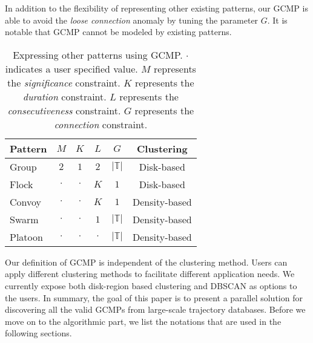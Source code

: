 In addition to the flexibility of representing other existing patterns, our GCMP is able to avoid the \emph{loose connection} anomaly by tuning the parameter $G$. 
It is notable that GCMP cannot be modeled by existing patterns. 
\begin{table}[h]
\centering
\begin{tabular}{|l|c|c|c|c|c|}
\hline 
\textbf{Pattern} & $M$ & $K$ & $L$ & $G$ & \textbf{Clustering} \\ 
\hline
Group & $2$ & $1$ & $2$ & $|\mathbb{T}|$ & Disk-based\\
\hline
Flock & $\cdot$ & $\cdot$ & $K$ & $1$ & Disk-based \\
\hline 
Convoy & $\cdot$ & $\cdot$ & $K$ & $1$ & Density-based\\ 
\hline 
Swarm & $\cdot$ & $\cdot$ & $1$ & $|\mathbb{T}|$ & Density-based \\ 
\hline 
Platoon & $\cdot$ & $\cdot$ & $\cdot$ & $|\mathbb{T}|$ & Density-based\\  
\hline 
\end{tabular} 
\caption{Expressing other patterns using GCMP. $\cdot$ indicates a user specified value. $M$ represents the 
\emph{significance} constraint. $K$ represents the \emph{duration} constraint. $L$ represents the \emph{consecutiveness} constraint. $G$ represents the \emph{connection} constraint.}
\label{tbl:patterns}
\end{table}

Our definition of GCMP is independent of the clustering method. Users can apply different clustering methods to facilitate different application needs. 
We currently expose both disk-region based clustering and DBSCAN as options to the users. In summary, the goal of this paper is to present a parallel solution for discovering all the valid GCMPs from large-scale trajectory databases. Before we move on to the algorithmic part, we list the notations that are used in the following sections.

